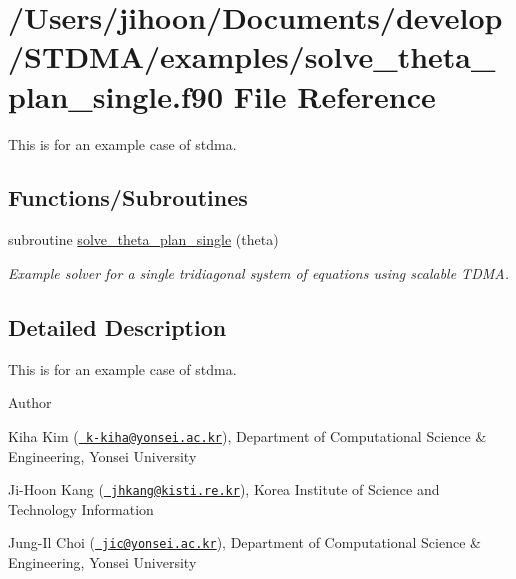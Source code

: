 \hypertarget{solve__theta__plan__single_8f90}{}\section{/\+Users/jihoon/\+Documents/develop/\+S\+T\+D\+M\+A/examples/solve\+\_\+theta\+\_\+plan\+\_\+single.f90 File Reference}
\label{solve__theta__plan__single_8f90}


This is for an example case of stdma.  


\subsection*{Functions/\+Subroutines}
\begin{DoxyCompactItemize}
\item 
subroutine \mbox{\hyperlink{solve__theta__plan__single_8f90_a53ef6756822306f33a47be6a66232862}{solve\+\_\+theta\+\_\+plan\+\_\+single}} (theta)
\begin{DoxyCompactList}\small\item\em Example solver for a single tridiagonal system of equations using scalable T\+D\+MA. \end{DoxyCompactList}\end{DoxyCompactItemize}


\subsection{Detailed Description}
This is for an example case of stdma. 

\begin{DoxyAuthor}{Author}

\end{DoxyAuthor}

\begin{DoxyItemize}
\item Kiha Kim (\href{mailto:k-kiha@yonsei.ac.kr}{\texttt{ k-\/kiha@yonsei.\+ac.\+kr}}), Department of Computational Science \& Engineering, Yonsei University
\item Ji-\/\+Hoon Kang (\href{mailto:jhkang@kisti.re.kr}{\texttt{ jhkang@kisti.\+re.\+kr}}), Korea Institute of Science and Technology Information
\item Jung-\/\+Il Choi (\href{mailto:jic@yonsei.ac.kr}{\texttt{ jic@yonsei.\+ac.\+kr}}), Department of Computational Science \& Engineering, Yonsei University
\end{DoxyItemize}

